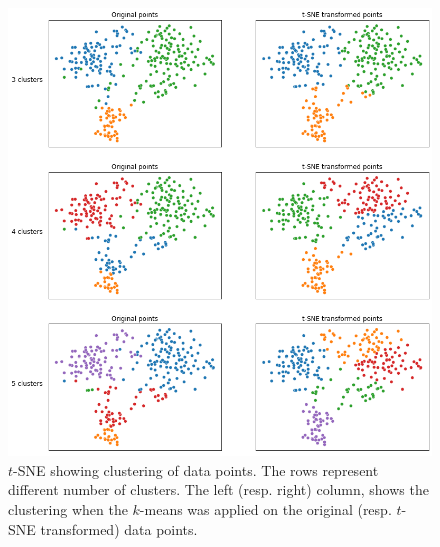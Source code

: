 \documentclass[11pt, english, twocolumn]{article}
\begin{document}
\begin{figure}[b]
	\centering
	\includegraphics[width=\textwidth]{tSNE-clusters}
	\caption{$t$-SNE showing clustering of data points. The rows represent different number of clusters. The left (resp. right) column, shows the clustering when the $k$-means was applied on the original (resp. $t$-SNE transformed) data points.}
	\label{fig:tSNE-clusters}
\end{figure}

  
\end{document}
